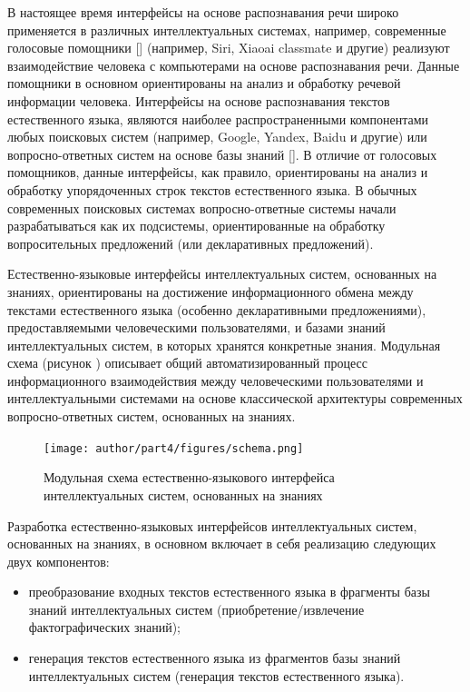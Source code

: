 В настоящее время интерфейсы на основе распознавания речи широко применяется в различных интеллектуальных системах, например, современные голосовые помощники [] (например, Siri, Xiaoai classmate и другие) реализуют взаимодействие человека с компьютерами на основе распознавания речи. Данные помощники в основном ориентированы на анализ и обработку речевой информации человека. Интерфейсы на основе распознавания текстов естественного языка, являются наиболее распространенными компонентами любых поисковых систем (например, Google, Yandex, Baidu и другие) или вопросно-ответных систем на основе базы знаний []. В отличие от голосовых помощников, данные интерфейсы, как правило, ориентированы на анализ и обработку упорядоченных строк текстов естественного языка. В обычных современных поисковых системах вопросно-ответные системы начали разрабатываться как их подсистемы, ориентированные на обработку вопросительных предложений (или декларативных предложений).

Естественно-языковые интерфейсы интеллектуальных систем, основанных на знаниях, ориентированы на достижение информационного обмена между текстами естественного языка (особенно декларативными предложениями), предоставляемыми человеческими пользователями, и базами знаний интеллектуальных систем, в которых хранятся конкретные знания. Модульная схема (рисунок \textit{}) описывает общий автоматизированный процесс информационного взаимодействия между человеческими пользователями и интеллектуальными системами на основе классической архитектуры современных вопросно-ответных систем, основанных на знаниях. 

\begin{figure}[H]
	\texttt{[image: author/part4/figures/schema.png]}
	\caption{Модульная схема естественно-языкового интерфейса интеллектуальных систем, основанных на знаниях}
	\label{fig:schema-natural-interface}
\end{figure}

Разработка естественно-языковых интерфейсов интеллектуальных систем, основанных на знаниях, в основном включает в себя реализацию следующих двух компонентов:
\begin{itemize}
	\item преобразование входных текстов естественного языка в фрагменты базы знаний интеллектуальных систем (приобретение/извлечение фактографических знаний);
	\item генерация текстов естественного языка из фрагментов базы знаний интеллектуальных систем (генерация текстов естественного языка).
\end{itemize}

